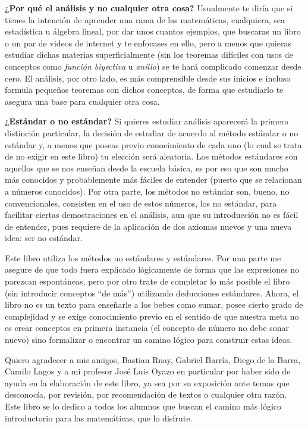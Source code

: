 \documentclass[11pt,oneside,a4paper]{book}
\begin{document}
\textbf{¿Por qué el análisis y no cualquier otra cosa?} Usualmente te diría que si tienes la intención de aprender una rama de las matemáticas, cualquiera, sea estadística u álgebra lineal, por dar unos cuantos ejemplos, que buscaras un libro o un par de videos de internet y te enfocases en ello, pero a menos que quieras estudiar dichas materias superficialmente (sin los teoremas difíciles con usos de conceptos como \textit{función biyectiva} u \textit{anillo}) se te hará complicado comenzar desde cero. El análisis, por otro lado, es más comprensible desde sus inicios e incluso formula pequeños teoremas con dichos conceptos, de forma que estudiarlo te asegura una base para cualquier otra cosa.

\textbf{¿Estándar o no estándar?} Si quieres estudiar análisis aparecerá la primera distinción particular, la decisión de estudiar de acuerdo al método estándar o no estándar y, a menos que poseas previo conocimiento de cada uno (lo cual se trata de no exigir en este libro) tu elección será aleatoria. Los métodos estándares son aquellos que se nos enseñan desde la escuela básica, es por eso que son mucho más conocidos y probablemente más fáciles de entender (puesto que se relacionan a números conocidos). Por otra parte, los métodos no estándar son, bueno, no convencionales, consisten en el uso de estos números, los no estándar, para facilitar ciertas demostraciones en el análisis, aun que su introducción no es fácil de entender, pues requiere de la aplicación de dos axiomas nuevos  y una nueva idea: ser no estándar.

Este libro utiliza los métodos no estándares y estándares. Por una parte me asegure de que todo fuera explicado lógicamente de forma que las expresiones no parezcan espontáneas, pero por otro trate de completar lo más posible el libro (sin introducir conceptos ``de más'') utilizando deducciones estándares. Ahora, el libro no es un texto para enseñarle a los bebes como sumar, posee cierto grado de complejidad y se exige conocimiento previo en el sentido de que nuestra meta no es crear conceptos en primera instancia (el concepto de número no debe sonar nuevo) sino formalizar o encontrar un camino lógico para construir estas ideas.

Quiero agradecer a mis amigos, Bastian Ruay, Gabriel Barría, Diego de la Barra, Camilo Lagos y a mi profesor José Luis Oyazo en particular por haber sido de ayuda en la elaboración de este libro, ya sea por su exposición ante temas que desconocía, por revisión, por recomendación de textos o cualquier otra razón. Este libro se lo dedico a todos los alumnos que buscan el camino más lógico introductorio para las matemáticas, que lo disfrute.
\end{document}
